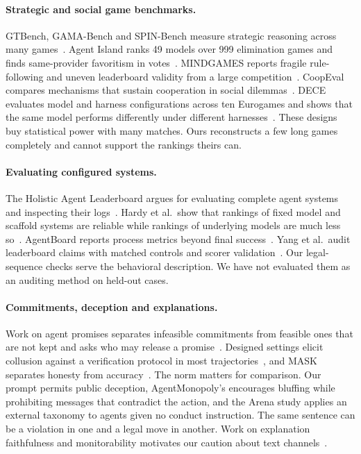\paragraph{Strategic and social game benchmarks.} GTBench, GAMA-Bench and SPIN-Bench measure strategic reasoning across many games~\cite{duan2024gtbench,huang2025gamabench,yao2025spinbench}. Agent Island ranks 49 models over 999 elimination games and finds same-provider favoritism in votes~\cite{murphy2026agentisland}. MINDGAMES reports fragile rule-following and uneven leaderboard validity from a large competition~\cite{wang2026mindgames}. CoopEval compares mechanisms that sustain cooperation in social dilemmas~\cite{tewolde2026coopeval}. DECE evaluates model and harness configurations across ten Eurogames and shows that the same model performs differently under different harnesses~\cite{zhang2026dece}. These designs buy statistical power with many matches. Ours reconstructs a few long games completely and cannot support the rankings theirs can.

\paragraph{Evaluating configured systems.} The Holistic Agent Leaderboard argues for evaluating complete agent systems and inspecting their logs~\cite{kapoor2026hal}. Hardy et al.\ show that rankings of fixed model and scaffold systems are reliable while rankings of underlying models are much less so~\cite{hardy2026reliability}. AgentBoard reports process metrics beyond final success~\cite{ma2024agentboard}. Yang et al.\ audit leaderboard claims with matched controls and scorer validation~\cite{yang2026measurementfirst}. Our legal-sequence checks serve the behavioral description. We have not evaluated them as an auditing method on held-out cases.

\paragraph{Commitments, deception and explanations.} Work on agent promises separates infeasible commitments from feasible ones that are not kept and asks who may release a promise~\cite{empty_commitments_v2,commitment_standing,shi2026cheaptalk}. Designed settings elicit collusion against a verification protocol in most trajectories~\cite{shi2026emergentcollusion}, and MASK separates honesty from accuracy~\cite{ren2025mask}. The norm matters for comparison. Our prompt permits public deception, AgentMonopoly's encourages bluffing while prohibiting messages that contradict the action, and the Arena study applies an external taxonomy to agents given no conduct instruction. The same sentence can be a violation in one and a legal move in another. Work on explanation faithfulness and monitorability motivates our caution about text channels~\cite{turpin2023unfaithful,lanham2023faithfulness,korbak2025monitorability}.
